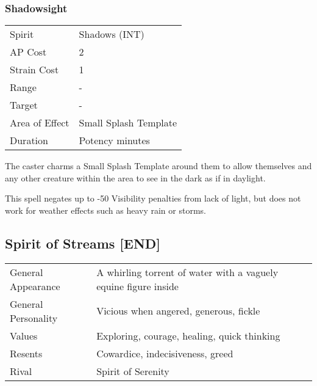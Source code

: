 \documentclass[11pt,a4paper,twocolumn]{book}
\begin{document}
\subsubsection*{Shadowsight}
{
	\begin{tabu} to 75mm{| X[l,4] | X[l,7] |}
		\hline
		Spirit         & Shadows (INT)         \\
		AP Cost        & 2                     \\
		Strain Cost    & 1                     \\
		Range          & -                     \\
		Target         & -                     \\
		Area of Effect & Small Splash Template \\
		Duration       & Potency minutes       \\ \hline
	\end{tabu}
	
}

\medskip

The caster charms a Small Splash Template around them to allow themselves and any other creature within the area to see in the dark as if in daylight.

This spell negates up to -50 Visibility penalties from lack of light, but does not work for weather effects such as heavy rain or storms.

\subsection*{Spirit of Streams [END]}
{
	\begin{tabu} to 75mm{| X[l,4] | X[l,8] |}
		\hline
		General Appearance  & A whirling torrent of water with a vaguely equine figure inside \\
		General Personality & Vicious when angered, generous, fickle                          \\
		Values              & Exploring, courage, healing, quick thinking                     \\
		Resents             & Cowardice, indecisiveness, greed                                \\
		Rival               & Spirit of Serenity                                              \\ \hline
	\end{tabu}
	
}
\end{document}
